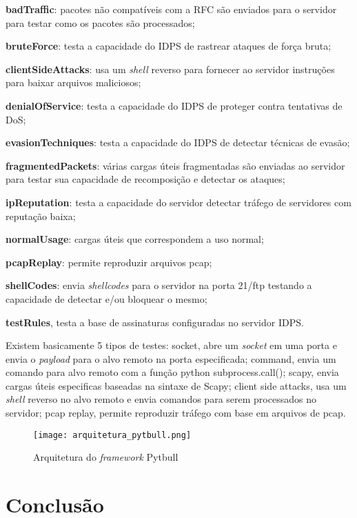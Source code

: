  \begin{alineas}
  \item \textbf{badTraffic}: pacotes não compatíveis com a RFC são enviados para o servidor para testar como os pacotes são processados; 
  \item \textbf{bruteForce}: testa a capacidade do IDPS de rastrear ataques de força bruta;
  \item \textbf{clientSideAttacks}: usa um \textit{shell} reverso para fornecer ao servidor instruções para baixar arquivos maliciosos; 
  \item \textbf{denialOfService}: testa a capacidade do IDPS de proteger contra tentativas de DoS; 
  \item \textbf{evasionTechniques}: testa a capacidade do IDPS de detectar técnicas de evasão; 
  \item \textbf{fragmentedPackets}: várias cargas úteis fragmentadas são enviadas ao servidor para testar sua capacidade de recomposição e detectar os ataques; 
  \item \textbf{ipReputation}: testa a capacidade do servidor detectar tráfego de servidores com reputação baixa;
  \item \textbf{normalUsage}: cargas úteis que correspondem a uso normal; 
  \item \textbf{pcapReplay}: permite reproduzir arquivos pcap; 
  \item \textbf{shellCodes}: envia \textit{shellcodes} para o servidor na porta 21/ftp testando a capacidade de detectar e/ou bloquear o mesmo; 
  \item \textbf{testRules}, testa a base de assinaturas configuradas no servidor IDPS.
 \end{alineas}

 Existem basicamente 5 tipos de testes: socket, abre um \textit{socket} em uma porta e envia o \textit{payload} para o alvo remoto na porta especificada; command, envia um comando para alvo remoto com a função python subprocess.call(); scapy, envia cargas úteis especificas baseadas na sintaxe de Scapy; client side attacks, usa um \textit{shell} reverso no alvo remoto e envia comandos para serem processados no servidor; pcap replay, permite reproduzir tráfego com base em arquivos de pcap.

 \begin{figure}[htb]
  \centering
  \caption{Arquitetura do \textit{framework} Pytbull}
  \texttt{[image: arquitetura\_pytbull.png]}
  \legend{}
  \label{fig:pytbull}
 \end{figure}

 \section{Conclusão}
